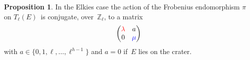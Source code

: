 \documentclass[10pt,a4paper]{beamer}
\theoremstyle{plain}
\theoremstyle{definition}
\theoremstyle{definition}
\theoremstyle{definition}
\newtheorem{prop}[thm]{Proposition}
\theoremstyle{definition}
\theoremstyle{remark}
\theoremstyle{remark}
\begin{document}
\begin{frame}

\begin{prop}\label{prop:matrice-Frobenius}
In the Elkies case the action of the Frobenius endomorphism $\pi$ on $T_\ell(E)$~is conjugate, over~$\mathbb{Z}_\ell$,
to a matrix \[\left ( \begin{matrix}{\color{red}\lambda} & a\\ 0 & {\color{blue}\mu} \end{matrix}\right ) \]  with $a \in \{ 0,1,\ell, \dots, \ell^{h-1}  \}$ and $a = 0$ if~$E$ lies on the crater.

\end{prop}

\begin{figure}
\begin{center}


\end{center}
\end{figure}
\end{frame}
\end{document}
